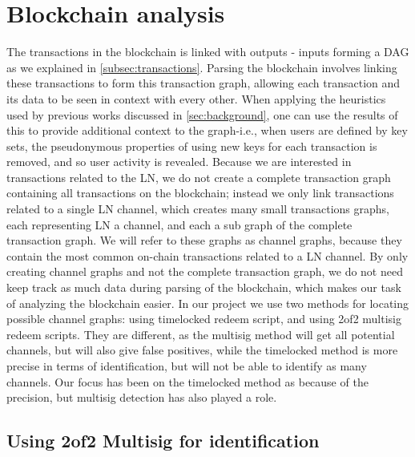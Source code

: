 \section{Blockchain analysis}
\label{blockchain_analysis}
The transactions in the blockchain is linked with outputs - inputs forming a DAG as we explained in \cref{subsec:transactions}. Parsing the blockchain involves linking these transactions to form this transaction graph, allowing each transaction and its data to be seen in context with every other. When applying the heuristics used by previous works discussed in \cref{sec:background}, one can use the results of this to provide additional context to the graph-i.e., when users are defined by key sets, the pseudonymous properties of using new keys for each transaction is removed, and so user activity is revealed. Because we are interested in transactions related to the LN, we do not create a complete transaction graph containing all transactions on the blockchain; instead we only link transactions related to a single LN channel, which creates many small transactions graphs, each representing LN a channel, and each a sub graph of the complete transaction graph. 
We will refer to these graphs as channel graphs, because they contain the most common on-chain transactions related to a LN channel.
By only creating channel graphs and not the complete transaction graph, we do not need keep track as much data during parsing of the blockchain, which makes our task of analyzing the blockchain easier. 
In our project we use two methods for locating possible channel graphs: using timelocked redeem script, and using 2of2 multisig redeem scripts.
They are different, as the multisig method will get all potential channels, but will also give false positives, while the timelocked method is more precise in terms of identification, but will not be able to identify as many channels.
Our focus has been on the timelocked method as because of the precision, but multisig detection has also played a role.


\subsection{Using 2of2 Multisig for identification}
\label{detection_ms}


